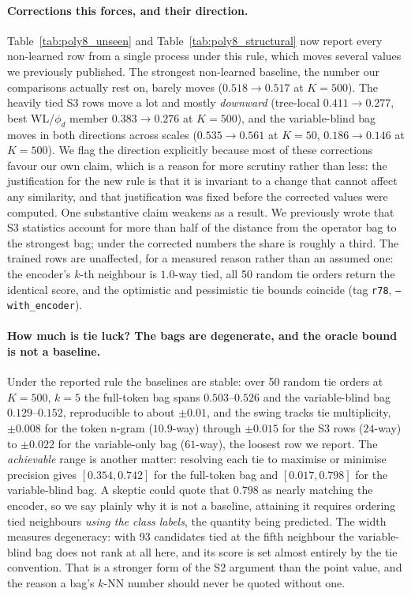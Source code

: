 \paragraph{Corrections this forces, and their direction.} Table~\ref{tab:poly8_unseen} and Table~\ref{tab:poly8_structural} now report every non-learned row from a single process under this rule, which moves several values we previously published. The strongest non-learned baseline, the number our comparisons actually rest on, barely moves ($0.518 \to 0.517$ at $K{=}500$). The heavily tied S3 rows move a lot and mostly \emph{downward} (tree-local $0.411 \to 0.277$, best WL/$\phi_d$ member $0.383 \to 0.276$ at $K{=}500$), and the variable-blind bag moves in both directions across scales ($0.535 \to 0.561$ at $K{=}50$, $0.186 \to 0.146$ at $K{=}500$). We flag the direction explicitly because most of these corrections favour our own claim, which is a reason for more scrutiny rather than less: the justification for the new rule is that it is invariant to a change that cannot affect any similarity, and that justification was fixed before the corrected values were computed. One substantive claim weakens as a result. We previously wrote that S3 statistics account for more than half of the distance from the operator bag to the strongest bag; under the corrected numbers the share is roughly a third. The trained rows are unaffected, for a measured reason rather than an assumed one: the encoder's $k$-th neighbour is $1.0$-way tied, all 50 random tie orders return the identical score, and the optimistic and pessimistic tie bounds coincide (tag \texttt{r78}, \texttt{--with\_encoder}).

\paragraph{How much is tie luck? The bags are degenerate, and the oracle bound is not a baseline.} Under the reported rule the baselines are stable: over 50 random tie orders at $K{=}500$, $k{=}5$ the full-token bag spans $0.503$--$0.526$ and the variable-blind bag $0.129$--$0.152$, reproducible to about $\pm 0.01$, and the swing tracks tie multiplicity, $\pm 0.008$ for the token n-gram ($10.9$-way) through $\pm 0.015$ for the S3 rows ($24$-way) to $\pm 0.022$ for the variable-only bag ($61$-way), the loosest row we report. The \emph{achievable} range is another matter: resolving each tie to maximise or minimise precision gives $[0.354, 0.742]$ for the full-token bag and $[0.017, 0.798]$ for the variable-blind bag. A skeptic could quote that $0.798$ as nearly matching the encoder, so we say plainly why it is not a baseline, attaining it requires ordering tied neighbours \emph{using the class labels}, the quantity being predicted. The width measures degeneracy: with 93 candidates tied at the fifth neighbour the variable-blind bag does not rank at all here, and its score is set almost entirely by the tie convention. That is a stronger form of the S2 argument than the point value, and the reason a bag's $k$-NN number should never be quoted without one.

